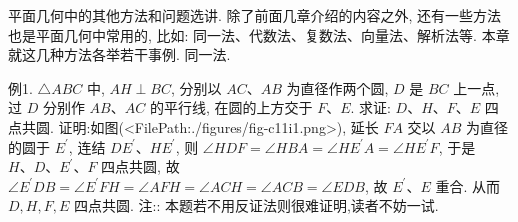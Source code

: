 
平面几何中的其他方法和问题选讲.
除了前面几章介绍的内容之外, 还有一些方法也是平面几何中常用的, 比如: 同一法、代数法、复数法、向量法、解析法等.
本章就这几种方法各举若干事例.
同一法.



例1. $ \triangle A B C$ 中, $A H \perp B C$, 分别以 $A C 、 A B$ 为直径作两个圆, $D$ 是 $B C$ 上一点,过 $D$ 分别作 $A B 、 A C$ 的平行线, 在圆的上方交于 $F 、 E$. 求证: $D 、 H 、 F 、 E$ 四点共圆.
证明:如图(<FilePath:./figures/fig-c11i1.png>), 延长 $F A$ 交以 $A B$ 为直径的圆于 $E^{\prime}$, 连结 $D E^{\prime} 、 H E^{\prime}$, 则 $\angle H D F=\angle H B A= \angle H E^{\prime} A=\angle H E^{\prime} F$, 于是 $H 、 D 、 E^{\prime} 、 F$ 四点共圆, 故 $\angle E^{\prime} D B=\angle E^{\prime} F H=\angle A F H=\angle A C H= \angle A C B=\angle E D B$, 故 $E^{\prime} 、 E$ 重合.
从而 $D, H, F, E$ 四点共圆.
注:: 本题若不用反证法则很难证明,读者不妨一试.



